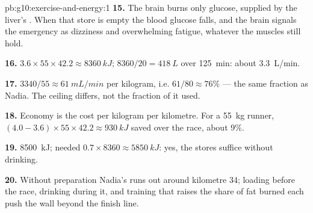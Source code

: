 \begin{solution}{pb:g10:exercise-and-energy:1}
\textbf{15.} The brain burns only glucose, supplied by the liver's
. When that store is empty the blood glucose falls, and the
brain signals the emergency as dizziness and overwhelming fatigue,
whatever the muscles still hold.

\textbf{16.} $3.6 \times 55 \times 42.2 \approx \qty{8360}{kJ}$;
$8360/20 = \qty{418}{L}$ over \qty{125}{min}: about \qty{3.3}{L/min}.

\textbf{17.} $3340/55 \approx \qty{61}{mL/min}$ per kilogram, i.e.
$61/80 \approx 76\%$ --- the same fraction as Nadia. The ceiling
differs, not the fraction of it used.

\textbf{18.} Economy is the cost per kilogram per kilometre. For a
\qty{55}{kg} runner, $(4.0 - 3.6) \times 55 \times 42.2 \approx
\qty{930}{kJ}$ saved over the race, about 9\%.

\textbf{19.}  \qty{8500}{kJ};  needed $0.7 \times
8360 \approx \qty{5850}{kJ}$: yes, the stores suffice without
drinking.

\textbf{20.} Without preparation Nadia's  runs out around
kilometre 34;  loading before the race, drinking
 during it, and training that raises the share of fat
burned each push the wall beyond the finish line.
\end{solution}
